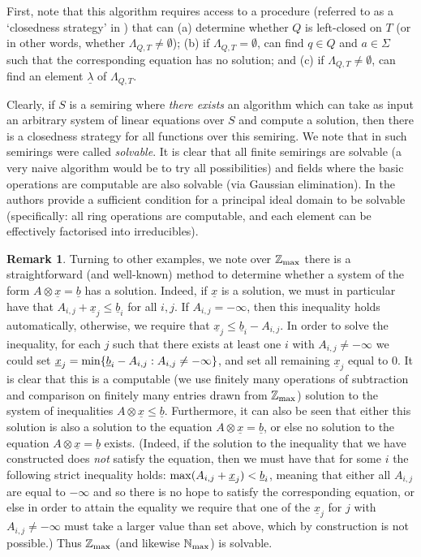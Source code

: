 \documentclass[10pt,a4paper]{amsart}
\theoremstyle{definition}
\newtheorem{rem}[thm]{Remark}
\numberwithin{equation}{section}
\numberwithin{theorem}{section}
\begin{document}
First, note that this algorithm requires  access to a procedure (referred to as a `closedness strategy' in \cite{HKRS20}) that can (a) determine whether $Q$ is left-closed on $T$ (or in other words, whether $\Lambda_{Q,T} \neq \emptyset$); (b) if $\Lambda_{Q,T} = \emptyset$, can find $q \in Q$ and $a \in \Sigma$ such that the corresponding equation has no solution; and (c)  if $\Lambda_{Q,T} \neq \emptyset$, can find an element $\underline{\lambda}$ of $\Lambda_{Q, T}$. 

Clearly, if $S$ is a semiring where \emph{there exists} an algorithm which can take as input an arbitrary system of linear equations over $S$ and compute a solution, then there is a closedness strategy for all functions over this semiring.  We note that in \cite{HKRS20} such semirings were called \emph{solvable}. It is clear that all finite semirings are solvable (a very naive algorithm would be to try all possibilities) and fields where the basic operations are computable are also solvable (via Gaussian elimination). In \cite{HKRS20} the authors provide a sufficient condition for a principal ideal domain to be solvable (specifically: all ring operations are computable, and each element can be effectively factorised into irreducibles). 

\begin{rem}Turning to other examples,  we note over $\mathbb{Z}_{\rm max}$ there is a straightforward (and well-known)  method to determine whether a system of the form $A \otimes \underline{x} = \underline{b}$ has a solution. Indeed, if $\underline{x}$ is a solution, we must in particular have that $A_{i,j} + \underline{x}_j \leq \underline{b}_i$ for all $i,j$. If $A_{i,j} = -\infty$,  then this inequality holds automatically, otherwise, we require that $\underline{x}_j \leq \underline{b}_i - A_{i,j}$. In order to solve the inequality, for each $j$ such that there exists at least one $i$ with $A_{i,j}\neq -\infty$ we could set $\underline{x}_j = {\rm min}\{\underline{b}_i-A_{i,j}: A_{i,j} \neq -\infty\}$, and set all remaining $\underline{x}_j$ equal to $0$. It is clear that this is a computable (we use finitely many operations of subtraction and comparison on finitely many entries drawn from $\mathbb{Z}_{\rm max}$) solution to the system of inequalities $A \otimes \underline{x} \leq \underline{b}$. Furthermore, it can also be seen that either this solution  is also a solution to the equation $A \otimes \underline{x} = \underline{b}$, or else no solution to the equation $A \otimes \underline{x} = \underline{b}$ exists. (Indeed, if the solution to the inequality that we have constructed does \emph{not} satisfy the equation, then we must have that for some $i$ the following strict inequality holds: ${\rm max} (A_{i,j} +\underline{x}_j) < \underline{b}_i$, meaning that either all $A_{i,j}$ are equal to $-\infty$ and so there is no hope to satisfy the corresponding equation, or else in order to attain the equality we require that one of the $\underline{x}_j$ for $j$ with $A_{i,j} \neq -\infty$ must take a larger value than set above, which by construction is not possible.) Thus $\mathbb{Z}_{\rm max}$ (and likewise $\mathbb{N}_{\rm max}$) is solvable.
\end{rem}
\end{document}
